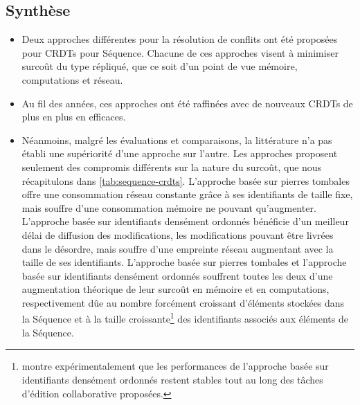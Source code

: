\documentclass[12pt]{thesul}
\begin{document}


\subsection{Synthèse}

\begin{itemize}
  \item Deux approches différentes pour la résolution de conflits ont été proposées pour \acp{CRDT} pour Séquence.
    Chacune de ces approches visent à minimiser surcoût du type répliqué, que ce soit d'un point de vue mémoire, computations et réseau.
  \item Au fil des années, ces approches ont été raffinées avec de nouveaux \acp{CRDT} de plus en plus en efficaces.
  \item Néanmoins, malgré les évaluations et comparaisons, la littérature n'a pas établi une supériorité d'une approche sur l'autre.
    Les approches proposent seulement des compromis différents sur la nature du surcoût, que nous récapitulons dans \autoref{tab:sequence-crdts}.
    L'approche basée sur pierres tombales offre une consommation réseau constante grâce à ses identifiants de taille fixe, mais souffre d'une consommation mémoire ne pouvant qu'augmenter.
    L'approche basée sur identifiants densément ordonnés bénéficie d'un meilleur délai de diffusion des modifications, les modifications pouvant être livrées dans le désordre, mais souffre d'une empreinte réseau augmentant avec la taille de ses identifiants.
    L'approche basée sur pierres tombales et l'approche basée sur identifiants densément ordonnés souffrent toutes les deux d'une augmentation théorique de leur surcoût en mémoire et en computations, respectivement dûe au nombre forcément croissant d'éléments stockées dans la Séquence et à la taille croissante\footnote{\cite{2011-evaluation-crdts-ahmed-nacer} montre expérimentalement que les performances de l'approche basée sur identifiants densément ordonnés restent stables tout au long des tâches d'édition collaborative proposées.} des identifiants associés aux éléments de la Séquence.


\end{itemize}
\end{document}
